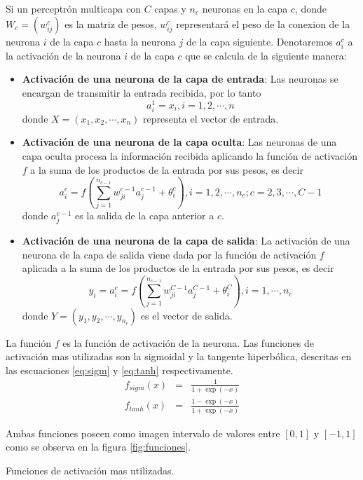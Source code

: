 Si un perceptrón multicapa con $C$ capas y $n_c$ neuronas en la capa $c$, donde $W_c = (w^{c}_{ij})$ es la matriz de pesos, $w^{c}_{ij}$ representará el peso de la conexion de la neurona $i$ de la capa $c$ hasta la neurona $j$ de la capa siguiente. Denotaremos $a^{c}_{i}$ a la activación de la neurona $i$ de la capa $c$ que se calcula de la siguiente manera:
\begin{itemize}
	\item {\bf Activación de una neurona de la capa de entrada}: Las neuronas se encargan de transmitir la entrada recibida, por lo tanto $$ a^{1}_{i} = x_{i}, i = 1, 2, \cdots, n$$ donde $X = (x_1, x_2, \cdots, x_n)$ representa el vector de entrada.

	\item {\bf Activación de una neurona de la capa oculta}: Las neuronas de una capa oculta procesa la información recibida aplicando la función de activación $f$ a la suma de los productos de la entrada por sus pesos, es decir $$ a^{c}_{i} = f\left(\sum^{n_{c - 1}}_{j=1} w^{c - 1}_{ji}a^{c - 1}_{j} + \theta^{c}_{i}\right), i = 1, 2, \cdots, n_c; c = 2, 3, \cdots, C - 1$$ donde $a^{c - 1}_{j}$ es la salida de la capa anterior a $c$.

	\item {\bf Activación de una neurona de la capa de salida}: La activación de una neurona de la capa de salida viene dada por la función de activación $f$ aplicada a la suma de los productos de la entrada por sus pesos, es decir $$ y_{i} = a^{c}_{i} = f\left(\sum^{n_{c - 1}}_{j=1} w^{C - 1}_{ji}a^{C - 1}_{j} + \theta^{C}_{i}\right), i = 1, \cdots, n_c$$ donde $Y = (y_1, y_2, \cdots, y_{n_{c}})$ es el vector de salida.
\end{itemize}

La función $f$ es la función de activación de la neurona. Las funciones de activación mas utilizadas son la sigmoidal y la tangente hiperbólica, descritas en las escuaciones \ref{eq:sigm} y \ref{eq:tanh} respectivamente.
\begin{eqnarray}
	f_{sigm}(x) &=& \frac{1}{1+\exp(-x)}\label{eq:sigm}\\
	f_{tanh}(x) &=& \frac{1 - \exp(-x)}{1 + \exp(-x)}\label{eq:tanh}
\end{eqnarray}

Ambas funciones poseen como imagen intervalo de valores entre $[0, 1]$ y $[-1, 1]$ como se observa en la figura \ref{fig:funciones}.%

\begin{imagen}
	\scalebox{1.0}{}
	\caption{Funciones de activación mas utilizadas.}
	\label{fig:funciones}
\end{imagen}


